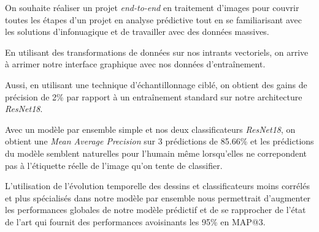 On souhaite réaliser un projet \emph{end-to-end} en traitement d'images pour couvrir toutes les étapes d'un projet en analyse prédictive tout en se familiarisant avec les solutions d'infonuagique et de travailler avec des données massives.

En utilisant des transformations de données sur nos intrants vectoriels, on arrive à arrimer notre interface graphique avec nos données d'entraînement. 

Aussi, en utilisant une technique d'échantillonnage ciblé, on obtient des gains de précision de 2\% par rapport à un entraînement standard sur notre architecture \emph{ResNet18}. 

Avec un modèle par ensemble simple et nos deux classificateurs \emph{ResNet18}, on obtient une \emph{Mean Average Precision} sur 3 prédictions de 85.66\% et les prédictions du modèle semblent naturelles pour l'humain même lorsqu'elles ne correpondent pas à l'étiquette réelle de l'image qu'on tente de classifier.

L'utilisation de l'évolution temporelle des dessins et classificateurs moins corrélés et plus spécialisés dans notre modèle par ensemble nous permettrait d'augmenter les performances globales de notre modèle prédictif et de se rapprocher de l'état de l'art qui fournit des performances avoisinants les 95\% en MAP@3.